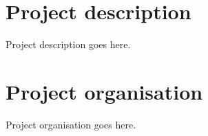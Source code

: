 \documentclass[a4paper,12pt]{article}
\begin{document}
\section{Project description}
Project description goes here.

\section{Project organisation}
Project organisation goes here.
\end{document}
